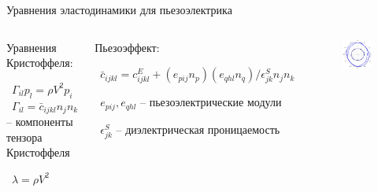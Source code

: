 \documentclass{beamer}
\begin{document}
\begin{frame}{Уравнения эластодинамики для пьезоэлектрика}
	
\begin{columns}
\column{7 cm}
	\begin{block}{Уравнения Кристоффеля:}

\ $\Gamma_{il} p_l = \rho V^2 p_i$\\

\ $\Gamma_{il} = \bar{c}_{ijkl} n_j n_k$ -- компоненты тензора Кристоффеля

\ $\lambda=\rho V^2$

  \end{block}
	
  \begin{block}{Пьезоэффект:}
	
\ $\bar{c}_{ijkl} = c_{ijkl}^E + (e_{pij} n_{p}) (e_{qhl} n_{q}) / \epsilon_{jk}^S n_{j} n_{k}$

\ $e_{pij}, e_{qhl}$ -- пьезоэлектрические модули

\ $\epsilon_{jk}^S$ -- диэлектрическая проницаемость

  \end{block}
	
\column{5 cm}
	
\begin{figure}

\includegraphics[width=5 cm]{linbo3_piezo.png}

\end{figure}

\end{columns}
\end{frame}

%
\end{document}
